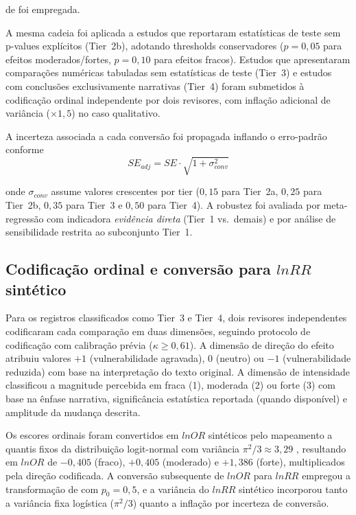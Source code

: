 \documentclass[12pt,a4paper]{article}
\begin{document}
\noindent de \citet{Lajeunesse2011} foi empregada.

A mesma cadeia foi aplicada a estudos que reportaram estatísticas de teste sem p-values explícitos (Tier~2b), adotando thresholds conservadores ($p = 0{,}05$ para efeitos moderados/fortes, $p = 0{,}10$ para efeitos fracos). Estudos que apresentaram comparações numéricas tabuladas sem estatísticas de teste (Tier~3) e estudos com conclusões exclusivamente narrativas (Tier~4) foram submetidos à codificação ordinal independente por dois revisores, com inflação adicional de variância ($\times 1{,}5$) no caso qualitativo.

A incerteza associada a cada conversão foi propagada inflando o erro-padrão conforme
%
\begin{equation}
SE_{adj} = SE \cdot \sqrt{1 + \sigma^2_{conv}}
\label{eq:se-adj}
\end{equation}

\noindent onde $\sigma_{conv}$ assume valores crescentes por tier ($0{,}15$ para Tier~2a, $0{,}25$ para Tier~2b, $0{,}35$ para Tier~3 e $0{,}50$ para Tier~4). A robustez foi avaliada por meta-regressão com indicadora \textit{evidência direta} (Tier~1 vs.~demais) e por análise de sensibilidade restrita ao subconjunto Tier~1.

\subsection{Codifica\c{c}\~ao ordinal e convers\~ao para \texorpdfstring{$lnRR$}{lnRR} sint\'etico}
\label{sec:coding}

Para os registros classificados como Tier~3 e Tier~4, dois revisores independentes codificaram cada comparação em duas dimensões, seguindo protocolo de codificação com calibração prévia ($\kappa \geq 0{,}61$). A dimensão de direção do efeito atribuiu valores $+1$ (vulnerabilidade agravada), $0$ (neutro) ou $-1$ (vulnerabilidade reduzida) com base na interpretação do texto original. A dimensão de intensidade classificou a magnitude percebida em fraca (1), moderada (2) ou forte (3) com base na ênfase narrativa, significância estatística reportada (quando disponível) e amplitude da mudança descrita.

Os escores ordinais foram convertidos em $lnOR$ sintéticos pelo mapeamento a quantis fixos da distribuição logit-normal com variância $\pi^2/3 \approx 3{,}29$ \citep{Hasselblad1995}, resultando em $lnOR$ de $-0{,}405$ (fraco), $+0{,}405$ (moderado) e $+1{,}386$ (forte), multiplicados pela direção codificada. A conversão subsequente de $lnOR$ para $lnRR$ empregou a transformação de \citet{Zhang1998} com $p_0 = 0{,}5$, e a variância do $lnRR$ sintético incorporou tanto a variância fixa logística ($\pi^2/3$) quanto a inflação por incerteza de conversão.
\end{document}
